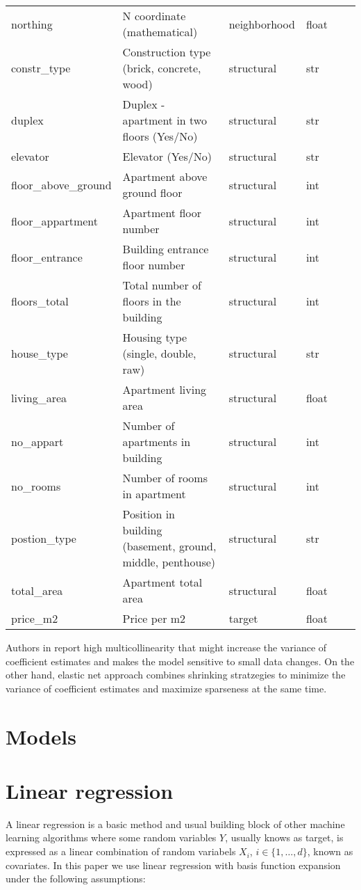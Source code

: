 \documentclass{article}
\begin{document}
\begin{table}[!ht]
\begin{longtable}{p{}p{}p{}p{}p{}p{}}
        northing & N coordinate (mathematical) & neighborhood & float \\
        constr\_type & Construction type (brick, concrete, wood) & structural & str \\
        duplex & Duplex - apartment in two floors (Yes/No) & structural & str \\
        elevator & Elevator (Yes/No) & structural & str \\
        floor\_above\_ground & Apartment above ground floor & structural & int \\
        floor\_appartment & Apartment floor number & structural & int \\
        floor\_entrance & Building entrance floor number & structural & int \\
        floors\_total & Total number of floors in the building & structural & int \\
        house\_type & Housing type (single, double, raw) & structural & str \\
        living\_area & Apartment living area & structural & float \\
        no\_appart & Number of apartments in building & structural & int \\
        no\_rooms & Number of rooms in apartment & structural & int \\
        postion\_type & Position in building (basement, ground, middle, penthouse) & structural & str \\
        total\_area & Apartment total area & structural & float \\
        price\_m2 & Price per m2 & target & float \\
       \bottomrule
     \end{longtable}
     \label{tab:table}
   \end{table}


   Authors in \cite{ceh_estimating_2018} report high multicollinearity that might increase the variance of coefficient estimates and makes the model sensitive to small data changes. On the other hand, elastic net approach combines shrinking stratzegies to minimize the variance of coefficient estimates and maximize sparseness at the same time.


\section{Models}
\section{Linear regression}
A linear regression is a basic method and usual building block of other machine learning algorithms where some random variables $Y$, usually knows as target, is expressed as a linear combination of random variabels $X_i$, $i\in\{1,\ldots, d\}$, known as covariates. In this paper we use linear regression with basis function expansion under the following assumptions:
\end{document}
